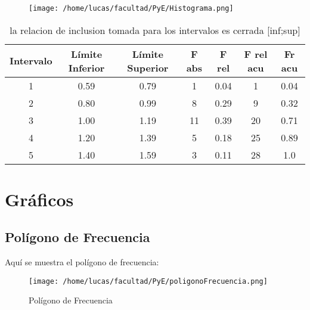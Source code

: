 \begin{figure}[h]
  \begin{center}
    \texttt{[image: /home/lucas/facultad/PyE/Histograma.png]}
  \end{center}
\end{figure}




\begin{table}[h]
\centering
\begin{tabular}{|c|c|c|c|c|c|c|}
\hline
\textbf{Intervalo} & \textbf{Límite Inferior} & \textbf{Límite Superior} & \textbf{F abs} & \textbf{F rel} & \textbf{F rel acu} & \textbf{Fr acu} \\ \hline
1                  & 0.59                    & 0.79                    & 1             & 0.04          & 1             & 0.04            \\ \hline
2                  & 0.80                    & 0.99                    & 8             & 0.29          & 9             & 0.32            \\ \hline
3                  & 1.00                    & 1.19                    & 11            & 0.39          & 20            & 0.71            \\ \hline
4                  & 1.20                    & 1.39                    & 5             & 0.18          & 25            & 0.89            \\ \hline
5                  & 1.40                    & 1.59                    & 3             & 0.11          & 28            & 1.0             \\ \hline
\end{tabular}
\caption{la relacion de inclusion tomada para los intervalos es cerrada [inf;sup]}
\end{table}

\section{Gráficos}

\subsection{Polígono de Frecuencia}

Aquí se muestra el polígono de frecuencia:

\begin{figure}[h]
  \centering
  \texttt{[image: /home/lucas/facultad/PyE/poligonoFrecuencia.png]} %
  \caption{Polígono de Frecuencia}
\end{figure}

